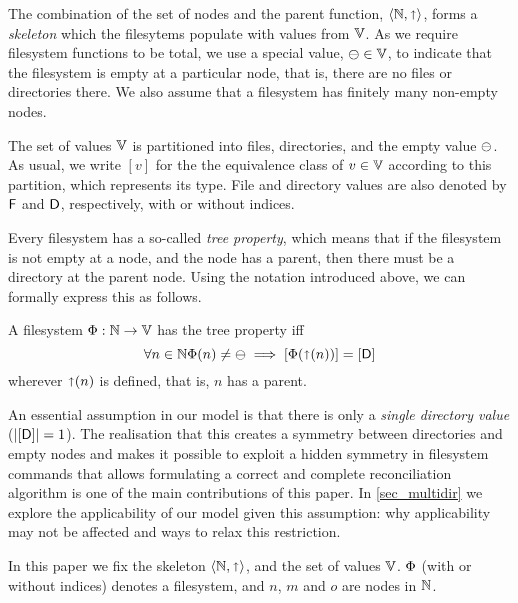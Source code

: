 The combination of the set of nodes and the parent function,
$\langle \mathbb{N}, \mathord{\shortuparrow} \rangle$, forms a \emph{skeleton}
which the filesytems populate with values from $\mathbb{V}$.
As we require filesystem functions to be total,
we use a special value, $\ominus\in\mathbb{V}$, to indicate that the filesystem
is empty at a particular node, that is, there are no files or directories there.
We also assume that a filesystem has finitely many non-empty nodes.

\begin{mydef}
The set of values $\mathbb{V}$ is partitioned into files, directories, and the empty value $\ominus$.
As usual, we write $[v]$ for the the equivalence class of $v\in\mathbb{V}$ according to this partition,
which represents its type.
File and directory values are also denoted by $\mathsf{F}$ and $\mathsf{D}$, respectively,
with or without indices.
\end{mydef}


Every filesystem has a so-called \emph{tree property}, which means that
if the filesystem is not empty at a node, and the node has a parent,
then there must be a directory at the parent node.
Using the notation introduced above, we can formally express this as follows.
\begin{mydef}
A filesystem $\Phi:\mathbb{N} \rightarrow \mathbb{V}$ has the tree property iff
\[ \forall n\in\mathbb{N}
\Phi(n) \neq \ominus \; \Longrightarrow \; [\Phi(\mathord{\shortuparrow}({n}))] = [\mathsf{D}] \]
wherever $\mathord{\shortuparrow}(n)$ is defined, that is, $n$ has a parent.
\end{mydef}


An essential assumption in our model is that there is only
a \emph{single directory value} ($|[\mathsf{D}]|=1$).
The realisation that
this creates a symmetry between directories and empty nodes
and makes it possible to exploit a hidden symmetry in filesystem commands
that allows formulating a correct and complete reconciliation algorithm
is one of the main contributions of this paper.
In \cref{sec_multidir} we explore the applicability of our model given this assumption:
why applicability may not be affected and ways to relax this restriction.


\myskip
In this paper
we fix the skeleton $\langle\mathbb{N},\mathord{\shortuparrow}\rangle$,
and the set of values $\mathbb{V}$.
$\Phi$ (with or without indices) denotes a filesystem,
and $n$, $m$ and $o$ are nodes in $\mathbb{N}$.
